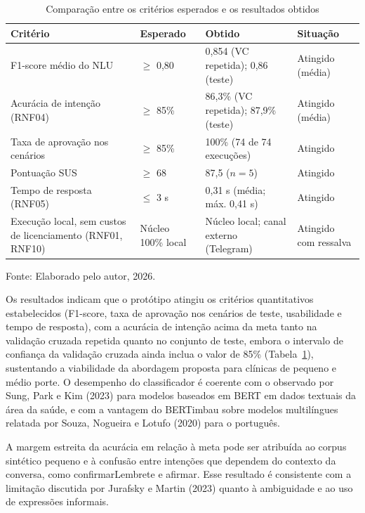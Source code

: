 \documentclass[12pt,a4paper]{extarticle}
\begin{document}
\begin{table}[H]
\centering
\caption{Comparação entre os critérios esperados e os resultados obtidos}
\label{tab:esperado_obtido}
\begin{tabular}{p{4.6cm}p{2.8cm}p{2.6cm}p{2.4cm}}
\hline
\textbf{Critério} & \textbf{Esperado} & \textbf{Obtido} & \textbf{Situação} \\
\hline
F1-score médio do NLU & $\geq$ 0,80 & 0,854 (VC repetida); 0,86 (teste) & Atingido (média) \\
Acurácia de intenção (RNF04) & $\geq$ 85\% & 86,3\% (VC repetida); 87,9\% (teste) & Atingido (média) \\
Taxa de aprovação nos cenários & $\geq$ 85\% & 100\% (74 de 74 execuções) & Atingido \\
Pontuação SUS & $\geq$ 68 & 87,5 ($n = 5$) & Atingido \\
Tempo de resposta (RNF05) & $\leq$ 3 s & 0,31 s (média; máx. 0,41 s) & Atingido \\
Execução local, sem custos de licenciamento (RNF01, RNF10) & Núcleo 100\% local & Núcleo local; canal externo (Telegram) & Atingido com ressalva \\
\hline
\end{tabular}
\vspace{0.3cm}

\footnotesize{Fonte: Elaborado pelo autor, 2026.}
\end{table}

Os resultados indicam que o protótipo atingiu os critérios quantitativos estabelecidos (F1-score, taxa de aprovação nos cenários de teste, usabilidade e tempo de resposta), com a acurácia de intenção acima da meta tanto na validação cruzada repetida quanto no conjunto de teste, embora o intervalo de confiança da validação cruzada ainda inclua o valor de 85\% (Tabela~\ref{tab:esperado_obtido}), sustentando a viabilidade da abordagem proposta para clínicas de pequeno e médio porte. O desempenho do classificador é coerente com o observado por Sung, Park e Kim (2023) para modelos baseados em BERT em dados textuais da área da saúde, e com a vantagem do BERTimbau sobre modelos multilíngues relatada por Souza, Nogueira e Lotufo (2020) para o português.

A margem estreita da acurácia em relação à meta pode ser atribuída ao corpus sintético pequeno e à confusão entre intenções que dependem do contexto da conversa, como confirmarLembrete e afirmar. Esse resultado é consistente com a limitação discutida por Jurafsky e Martin (2023) quanto à ambiguidade e ao uso de expressões informais.
\end{document}
